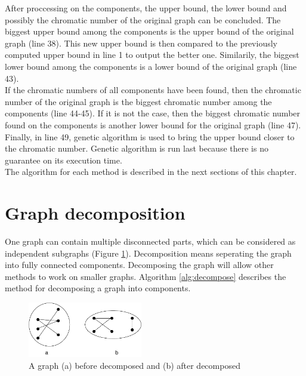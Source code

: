 \documentclass[a4paper]{report}
\begin{document}
	After proccessing on the components, the upper bound, the lower bound and possibly the chromatic number of the original graph can be concluded. The biggest upper bound among the components is the upper bound of the original graph (line 38). This new upper bound is then compared to the previously computed upper bound in line 1 to output the better one. Similarily, the biggest lower bound among the components is a lower bound of the original graph (line 43). \\
	If the chromatic numbers of all components have been found, then the chromatic number of the original graph is the biggest chromatic number among the components (line 44-45). If it is not the case, then the biggest chromatic number found on the components is another lower bound for the original graph (line 47).\\
	Finally, in line 49, genetic algorithm is used to bring the upper bound closer to the chromatic number. Genetic algorithm is run last because there is no guarantee on its execution time.\\
	
	The algorithm for each method is described in the next sections of this chapter.
	

		\section{Graph decomposition}
		One graph can contain multiple disconnected parts, which can be considered as independent subgraphs (Figure \ref{fig:decompose}). Decomposition means seperating the graph into fully connected components. Decomposing the graph will allow other methods to work on smaller graphs. Algorithm \ref{alg:decompose} describes the method for decomposing a graph into components.\\
		
		\begin{figure}[h]
			\centering
			\includegraphics[width=50mm,scale=0.5]{figures/DecomposedGraph.pdf}
			\caption{A graph (a) before decomposed and (b) after decomposed}
			\label{fig:decompose}
		\end{figure}
	
\end{document}
